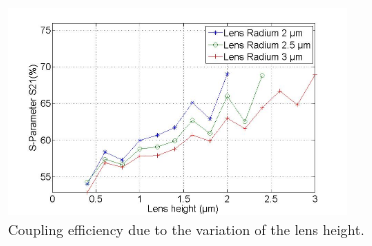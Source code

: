 \begin{figure}[!ht]
\centering
\includegraphics[width=0.8\textwidth]{bilder/s21_fix_lens_radium_hxx}
\caption{Coupling efficiency due to the variation of the lens height.}
\label{fig:coupling_lenses_curve_hxx}
\end{figure}

